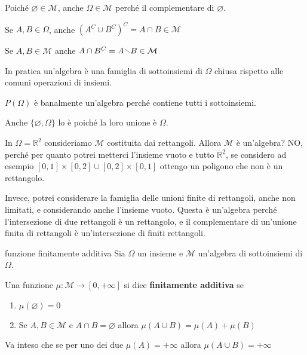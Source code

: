 \begin{remark}
    Poiché \(\varnothing \in \mathcal{M}\), anche \(\Omega \in \mathcal{M}\)
    perché il complementare di \(\varnothing\).
\end{remark}

\begin{remark}
Se \(A, B \in \Omega\), anche \({(A^{C} \cup B^{C})}^{C} = A \cap B \in
\mathcal{M}\) 
\end{remark}

\begin{remark}
    Se \(A, B \in \mathcal{M}\) anche \(A \cap B^{C} = A
    \sminus B \in
    \mathcal{M}\) 
\end{remark}

In pratica un'algebra è una famiglia di sottoinsiemi di \(\Omega\) chiusa
rispetto alle comuni operazioni di insiemi.

\begin{example}
    \(P(\Omega)\) è banalmente un'algebra perché contiene tutti i sottoinsiemi.

    Anche \(\{\varnothing, \Omega\}\) lo è poiché la loro unione è \(\Omega\).
\end{example}

\begin{example}
    In \(\Omega = \mathbb{R}^2\) consideriamo \(\mathcal{M}\) costituita dai
    rettangoli. Allora \(\mathcal{M}\) è un'algebra? NO, perché per quanto
    potrei metterci l'insieme vuoto e tutto \(\mathbb{R}^2\), se considero ad
    esempio \([0, 1] \times [0, 2] \cup [0, 2] \times [0, 1]\) ottengo un
    poligono che non è un rettangolo.

    Invece, potrei considerare la famiglia delle unioni finite di rettangoli,
    anche non limitati, e considerando anche l'insieme vuoto.
    Questa è un'algebra perché l'intersezione di due rettangoli è un rettangolo,
    e il complementare di un'unione finita di rettangoli è un'intersezione di
    finiti rettangoli.
\end{example}

\begin{definition}{funzione finitamente additiva}
     Sia \(\Omega\) un insieme e \(\mathcal{M}\) un'algebra di sottoinsiemi di
     \(\Omega\).

     Una funzione \(\mu : \mathcal{M} \to [0, +\infty]\) si dice
     \textbf{finitamente additiva} se
\begin{enumerate}[label = \arabic*.]
    \item \(\mu(\varnothing) = 0\) 
    \item Se \(A, B \in \mathcal{M}\) e \(A \cap B = \varnothing\) allora
        \(\mu(A \cup B) = \mu(A) + \mu(B)\) 
\end{enumerate}
Va inteso che se per uno dei due \(\mu(A) = +\infty\) allora
\(\mu(A \cup B) = +\infty\) 
\end{definition}


